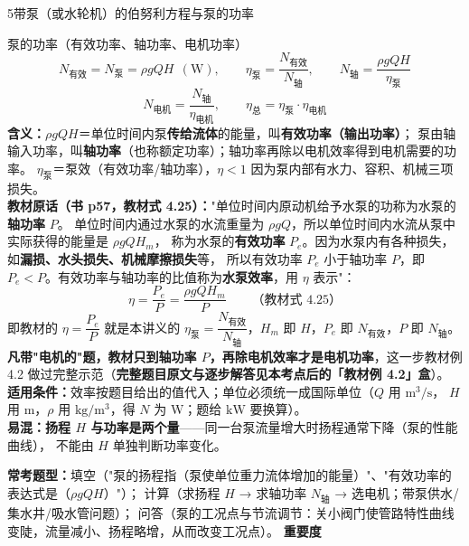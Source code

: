 \begin{kaodian}{5}{带泵（或水轮机）的伯努利方程与泵的功率}
\begin{gongshi}{泵的功率（有效功率、轴功率、电机功率）}
\[ N_{\text{有效}}=N_{\text{泵}}=\rho g Q H\ \ (\mathrm{W}),\qquad
   \eta_{\text{泵}}=\frac{N_{\text{有效}}}{N_{\text{轴}}},\qquad
   N_{\text{轴}}=\frac{\rho g Q H}{\eta_{\text{泵}}} \]
\[ N_{\text{电机}}=\frac{N_{\text{轴}}}{\eta_{\text{电机}}},\qquad
   \eta_{\text{总}}=\eta_{\text{泵}}\cdot\eta_{\text{电机}} \]
\textbf{含义：}$\rho gQH$＝单位时间内泵\textbf{传给流体}的能量，叫\textbf{有效功率（输出功率）}；
泵由轴输入功率，叫\textbf{轴功率}（也称额定功率）；轴功率再除以电机效率得到电机需要的功率。
$\eta_{\text{泵}}$＝泵效（有效功率/轴功率），$\eta<1$ 因为泵内部有水力、容积、机械三项损失。\\
\textbf{教材原话（书 p57，\textbf{教材式 4.25}）：}"单位时间内原动机给予水泵的功称为水泵的\textbf{轴功率} $P$。
单位时间内通过水泵的水流重量为 $\rho gQ$，所以单位时间内水流从泵中实际获得的能量是 $\rho gQH_m$，
称为水泵的\textbf{有效功率} $P_e$。因为水泵内有各种损失，如\textbf{漏损、水头损失、机械摩擦损失}等，
所以有效功率 $P_e$ 小于轴功率 $P$，即 $P_e<P$。有效功率与轴功率的比值称为\textbf{水泵效率}，用 $\eta$ 表示"：
\[ \eta=\frac{P_e}{P}=\frac{\rho gQH_m}{P}\qquad\text{（教材式 4.25）} \]
即教材的 $\eta=\dfrac{P_e}{P}$ 就是本讲义的 $\eta_{\text{泵}}=\dfrac{N_{\text{有效}}}{N_{\text{轴}}}$，$H_m$ 即 $H$，$P_e$ 即 $N_{\text{有效}}$，$P$ 即 $N_{\text{轴}}$。
\textbf{凡带"电机的"题，教材只到轴功率 $P$，再除电机效率才是电机功率}，这一步教材例 4.2 做过完整示范（\textbf{完整题目原文与逐步解答见本考点后的「教材例 4.2」盒}）。\\
\textbf{适用条件：}效率按题目给出的值代入；单位必须统一成国际单位（$Q$ 用 $\mathrm{m^3/s}$，
$H$ 用 m，$\rho$ 用 $\mathrm{kg/m^3}$，得 $N$ 为 W；题给 $\mathrm{kW}$ 要换算）。\\
\textbf{易混：}\textbf{扬程 $H$ 与功率是两个量}——同一台泵流量增大时扬程通常下降（泵的性能曲线），
不能由 $H$ 单独判断功率变化。
\end{gongshi}

\textbf{常考题型：}填空（"泵的扬程指（泵使单位重力流体增加的能量）"、"有效功率的表达式是（$\rho gQH$）"）；
计算（求扬程 $H$ → 求轴功率 $N_{\text{轴}}$ → 选电机；带泵供水/集水井/吸水管问题）；
问答（泵的工况点与节流调节：关小阀门使管路特性曲线变陡，流量减小、扬程略增，从而改变工况点）。
\textbf{重要度 }\quad{}\quad{}


\end{kaodian}
